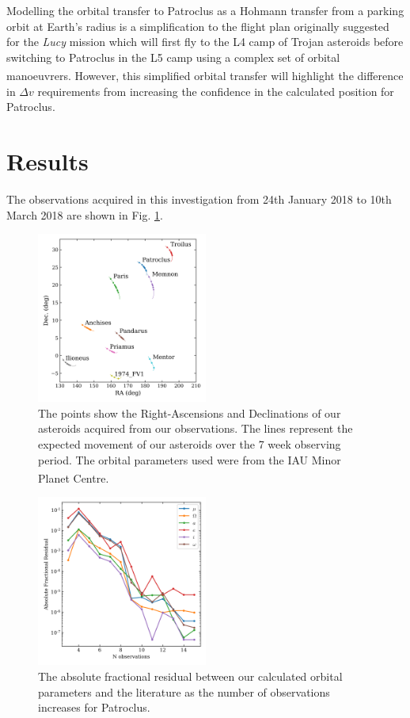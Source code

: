 \documentclass[10pt, twocolumn]{revtex4}    %
\newcommand{\scite}[1]{\textsuperscript{\cite{#1}}}
\begin{document}
Modelling the orbital transfer to Patroclus as a Hohmann transfer from a parking orbit at Earth's radius is a simplification to the flight plan originally suggested for the \textit{Lucy} mission which will first fly to the L4 camp of Trojan asteroids before switching to Patroclus in the L5 camp using a complex set of orbital manoeuvrers.\scite{47thLunarPlanetary} However, this simplified orbital transfer will highlight the difference in $\Delta v$ requirements from increasing the confidence in the calculated position for Patroclus.

\section{Results} 

The observations acquired in this investigation from 24th January 2018 to 10th March 2018 are shown in Fig. \ref{fig: observations}.

\begin{figure}[h!]
\centering
\includegraphics[width=0.5\textwidth]{20180402_115205_OBSERVATIONS_MAP}
\caption{The points show the Right-Ascensions and Declinations of our asteroids acquired from our observations. The lines represent the expected movement of our asteroids over the 7 week observing period. The orbital parameters used were from the IAU Minor Planet Centre.\scite{IAUMinorPlanet}}
\label{fig: observations}
\end{figure}

\begin{figure}[h!]
\centering
\includegraphics[width=0.5\textwidth]{20180402_155517_PAT_LIT_CONVERGENCE}
\caption{The absolute fractional residual between our calculated orbital parameters and the literature as the number of observations increases for Patroclus.}
\label{fig: pat convergence}
\end{figure}
\end{document}
